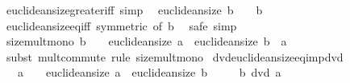 \begin{isabellebody}
%
\isadelimproof
\isanewline
%
\endisadelimproof
\isanewline
{}\isamarkupfalse%
\ euclidean{\isacharunderscore}{\kern0pt}size{\isacharunderscore}{\kern0pt}greater{\isacharunderscore}{\kern0pt}{}{\isacharunderscore}{\kern0pt}iff\ {\isacharbrackleft}{\kern0pt}simp{\isacharbrackright}{\kern0pt}{\isacharcolon}{\kern0pt}\isanewline
\ \ {\isachardoublequoteopen}euclidean{\isacharunderscore}{\kern0pt}size\ b\ {\isachargreater}{\kern0pt}\ {}\ {\isasymlongleftrightarrow}\ b\ {\isasymnoteq}\ {}{\isachardoublequoteclose}\isanewline
%
\isadelimproof
\ \ %
\endisadelimproof
%
\isatagproof
{}\isamarkupfalse%
\ euclidean{\isacharunderscore}{\kern0pt}size{\isacharunderscore}{\kern0pt}eq{\isacharunderscore}{\kern0pt}{}{\isacharunderscore}{\kern0pt}iff\ {\isacharbrackleft}{\kern0pt}symmetric{\isacharcomma}{\kern0pt}\ of\ b{\isacharbrackright}{\kern0pt}\ \isamarkupfalse%
\ safe\ simp%
\endisatagproof
{\isafoldproof}%
%
\isadelimproof
\isanewline
%
\endisadelimproof
\isanewline
{}\isamarkupfalse%
\ size{\isacharunderscore}{\kern0pt}mult{\isacharunderscore}{\kern0pt}mono{\isacharprime}{\kern0pt}{\isacharcolon}{\kern0pt}\ {\isachardoublequoteopen}b\ {\isasymnoteq}\ {}\ {\isasymLongrightarrow}\ euclidean{\isacharunderscore}{\kern0pt}size\ a\ {\isasymle}\ euclidean{\isacharunderscore}{\kern0pt}size\ {\isacharparenleft}{\kern0pt}b\ {\isacharasterisk}{\kern0pt}\ a{\isacharparenright}{\kern0pt}{\isachardoublequoteclose}\isanewline
%
\isadelimproof
\ \ %
\endisadelimproof
%
\isatagproof
{}\isamarkupfalse%
\ {\isacharparenleft}{\kern0pt}subst\ mult{\isachardot}{\kern0pt}commute{\isacharparenright}{\kern0pt}\ {\isacharparenleft}{\kern0pt}rule\ size{\isacharunderscore}{\kern0pt}mult{\isacharunderscore}{\kern0pt}mono{\isacharparenright}{\kern0pt}%
\endisatagproof
{\isafoldproof}%
%
\isadelimproof
\isanewline
%
\endisadelimproof
\isanewline
{}\isamarkupfalse%
\ dvd{\isacharunderscore}{\kern0pt}euclidean{\isacharunderscore}{\kern0pt}size{\isacharunderscore}{\kern0pt}eq{\isacharunderscore}{\kern0pt}imp{\isacharunderscore}{\kern0pt}dvd{\isacharcolon}{\kern0pt}\isanewline
\ \ \ {\isachardoublequoteopen}a\ {\isasymnoteq}\ {}{\isachardoublequoteclose}\ \ {\isachardoublequoteopen}euclidean{\isacharunderscore}{\kern0pt}size\ a\ {\isacharequal}{\kern0pt}\ euclidean{\isacharunderscore}{\kern0pt}size\ b{\isachardoublequoteclose}\isanewline
\ \ \ \ \ {\isachardoublequoteopen}b\ dvd\ a{\isachardoublequoteclose}\ \isanewline

\end{isabellebody}
